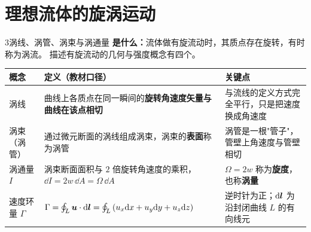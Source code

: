 \section{理想流体的旋涡运动}

\begin{kaodian}{3}{涡线、涡管、涡束与涡通量}
\textbf{是什么：}流体做有旋流动时，其质点存在旋转，有时称为涡流。
描述有旋流动的几何与强度概念有四个。

\begin{center}
\begin{tabularx}{\textwidth}{@{}lXX@{}}
\toprule
概念 & 定义（教材口径） & 关键点 \\
\midrule
涡线 & 曲线上各质点在同一瞬间的\textbf{旋转角速度矢量与曲线在该点相切} & 与流线的定义方式完全平行，只是把速度换成角速度 \\
涡束（涡管） & 通过微元断面的涡线组成涡束，涡束的\textbf{表面}称为涡管 & 涡管是一根"管子"，管壁上角速度与管壁相切 \\
涡通量 $I$ & 涡束断面面积与 $2$ 倍旋转角速度的乘积，$\dd I=2w\,\dd A=\Omega\,\dd A$ & $\Omega=2w$ 称为\textbf{旋度}，也称\textbf{涡量} \\
速度环量 $\Gamma$ & $\Gamma=\oint_L\bm{u}\cdot\mathrm{d}\bm{l}=\oint_L\left(u_x\mathrm{d} x+u_y\mathrm{d} y+u_z\mathrm{d} z\right)$ & 逆时针为正；$\mathrm{d}\bm{l}$ 为沿封闭曲线 $L$ 的有向线元 \\
\bottomrule
\end{tabularx}
\end{center}


\end{kaodian}
